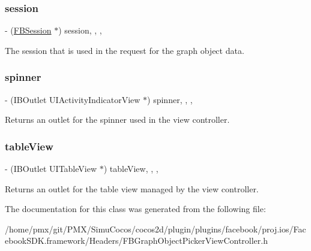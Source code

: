 \subsubsection{\texorpdfstring{session}{session}}
{\footnotesize\ttfamily -\/ (\hyperlink{interfaceFBSession}{F\+B\+Session} $\ast$) session\hspace{0.3cm}{\ttfamily [read]}, {\ttfamily [write]}, {\ttfamily [nonatomic]}, {\ttfamily [retain]}}

The session that is used in the request for the graph object data. \mbox{\label{interfaceFBGraphObjectPickerViewController_a51b10ee00428f30b615f15e087d4430a}} 
\subsubsection{\texorpdfstring{spinner}{spinner}}
{\footnotesize\ttfamily -\/ (I\+B\+Outlet U\+I\+Activity\+Indicator\+View $\ast$) spinner\hspace{0.3cm}{\ttfamily [read]}, {\ttfamily [write]}, {\ttfamily [nonatomic]}, {\ttfamily [retain]}}

Returns an outlet for the spinner used in the view controller. \mbox{\label{interfaceFBGraphObjectPickerViewController_a1d05e89ab63e8f4790585a060820fd24}} 
\subsubsection{\texorpdfstring{table\+View}{tableView}}
{\footnotesize\ttfamily -\/ (I\+B\+Outlet U\+I\+Table\+View $\ast$) table\+View\hspace{0.3cm}{\ttfamily [read]}, {\ttfamily [write]}, {\ttfamily [nonatomic]}, {\ttfamily [retain]}}

Returns an outlet for the table view managed by the view controller. 

The documentation for this class was generated from the following file\+:\begin{DoxyCompactItemize}
\item 
/home/pmx/git/\+P\+M\+X/\+Simu\+Cocos/cocos2d/plugin/plugins/facebook/proj.\+ios/\+Facebook\+S\+D\+K.\+framework/\+Headers/F\+B\+Graph\+Object\+Picker\+View\+Controller.\+h\end{DoxyCompactItemize}
